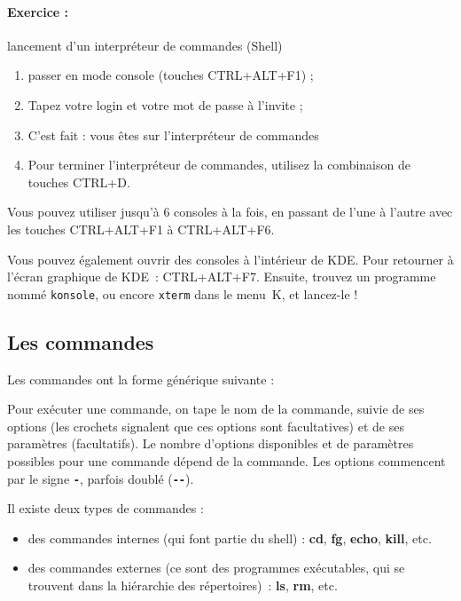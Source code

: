 \documentclass[12pt,a4paper]{article}
\begin{document}
\paragraph{Exercice :} lancement d'un interpréteur de commandes (Shell)

\begin{enumerate}
\item passer en mode console (touches CTRL+ALT+F1) ;
\item Tapez votre login et votre mot de passe à l'invite ;
\item C'est fait : vous êtes sur l'interpréteur de commandes
\item Pour terminer l'interpréteur de commandes, utilisez la
  combinaison de touches CTRL+D.
\end{enumerate}

Vous pouvez utiliser jusqu'à 6 consoles à la fois, en passant de
l'une à l'autre avec les touches CTRL+ALT+F1 à CTRL+ALT+F6.

Vous pouvez également ouvrir des consoles à l'intérieur de KDE. Pour
retourner à l'écran graphique de KDE~: CTRL+ALT+F7. Ensuite, trouvez
un programme nommé {\tt konsole}, ou encore {\tt xterm} dans le
menu~K, et lancez-le !




\subsection{Les commandes}

Les commandes ont la forme générique suivante :\\
\mbox{}\hspace{10em}{\bf commande [-option(s)] [paramètre(s)]}

Pour exécuter une commande, on tape le nom de la commande, suivie de
ses options (les crochets signalent que ces options sont facultatives)
et de ses paramètres (facultatifs). Le nombre d'options disponibles et
de paramètres possibles pour une commande dépend de la commande. Les
options commencent par le signe {\bf \tt -}, parfois doublé ({\bf \verb+--+}). 


Il existe deux types de commandes :
\begin{itemize}
\item des commandes internes (qui font partie du shell) : {\bf cd},
  {\bf fg}, {\bf echo}, {\bf kill}, etc.

\item des commandes externes (ce sont des programmes exécutables, qui
  se trouvent dans la hiérarchie des répertoires)~:
  {\bf ls}, {\bf rm}, etc.
\end{itemize}
\end{document}
